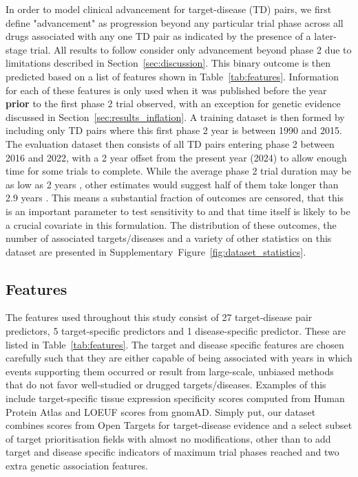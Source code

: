 \documentclass{article}
\begin{document}
In order to model clinical advancement for target-disease (TD) pairs, we first define "advancement" as progression beyond any particular trial phase across all drugs associated with any one TD pair as indicated by the presence of a later-stage trial. All results to follow consider only advancement beyond phase 2 due to limitations described in Section~\ref{sec:discussion}. This binary outcome is then predicted based on a list of features shown in Table~\ref{tab:features}. Information for each of these features is only used when it was published before the year \textbf{prior} to the first phase 2 trial observed, with an exception for genetic evidence discussed in Section~\ref{sec:results_inflation}. A training dataset is then formed by including only TD pairs where this first phase 2 year is between 1990 and 2015. The evaluation dataset then consists of all TD pairs entering phase 2 between 2016 and 2022, with a 2 year offset from the present year (2024) to allow enough time for some trials to complete. While the average phase 2 trial duration may be as low as 2 years \cite{fdaStepClinical}, other estimates would suggest half of them take longer than 2.9 years \cite{PMID:29394327}. This means a substantial fraction of outcomes are censored, that this is an important parameter to test sensitivity to and that time itself is likely to be a crucial covariate in this formulation. The distribution of these outcomes, the number of associated targets/diseases and a variety of other statistics on this dataset are presented in Supplementary~Figure~\ref{fig:dataset_statistics}.

\subsection{Features}

The features used throughout this study consist of 27 target-disease pair predictors, 5 target-specific predictors and 1 disease-specific predictor. These are listed in Table~\ref{tab:features}. The target and disease specific features are chosen carefully such that they are either capable of being associated with years in which events supporting them occurred or result from large-scale, unbiased methods that do not favor well-studied or drugged targets/diseases. Examples of this include target-specific tissue expression specificity scores computed from Human Protein Atlas \cite{PMID:25613900} and LOEUF \cite{PMID:32461654} scores from gnomAD. Simply put, our dataset combines scores from Open Targets for target-disease evidence and a select subset of target prioritisation \cite{OT23.12release} fields with almost no modifications, other than to add target and disease specific indicators of maximum trial phases reached and two extra genetic association features.
\end{document}
